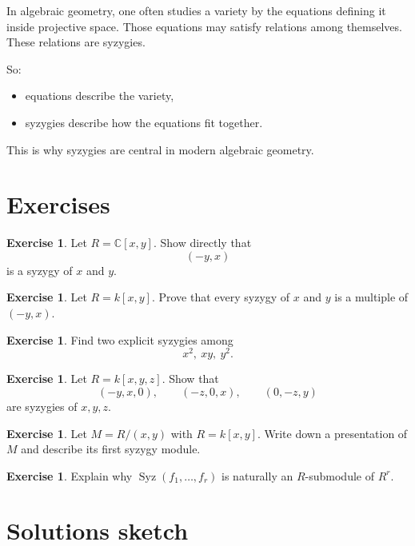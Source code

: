 \documentclass[11pt]{article}
\theoremstyle{definition}
\newtheorem{exercise}[theorem]{Exercise}
\theoremstyle{remark}
\newcommand{\C}{\mathbb{C}}
\newcommand{\Syz}{\operatorname{Syz}}
\begin{document}
	In algebraic geometry, one often studies a variety by the equations defining it inside projective space. Those equations may satisfy relations among themselves. These relations are syzygies.
	
	So:
	
	\begin{itemize}[leftmargin=2em]
		\item equations describe the variety,
		\item syzygies describe how the equations fit together.
	\end{itemize}
	
	This is why syzygies are central in modern algebraic geometry.
	
	\section{Exercises}
	
	\begin{exercise}
		Let \(R=\C[x,y]\). Show directly that
		\[
		(-y,x)
		\]
		is a syzygy of \(x\) and \(y\).
	\end{exercise}
	
	\begin{exercise}
		Let \(R=k[x,y]\). Prove that every syzygy of \(x\) and \(y\) is a multiple of \((-y,x)\).
	\end{exercise}
	
	\begin{exercise}
		Find two explicit syzygies among
		\[
		x^2,\ xy,\ y^2.
		\]
	\end{exercise}
	
	\begin{exercise}
		Let \(R=k[x,y,z]\). Show that
		\[
		(-y,x,0),\qquad (-z,0,x),\qquad (0,-z,y)
		\]
		are syzygies of \(x,y,z\).
	\end{exercise}
	
	\begin{exercise}
		Let \(M=R/(x,y)\) with \(R=k[x,y]\). Write down a presentation of \(M\) and describe its first syzygy module.
	\end{exercise}
	
	\begin{exercise}
		Explain why \(\Syz(f_1,\dots,f_r)\) is naturally an \(R\)-submodule of \(R^r\).
	\end{exercise}
	
	\section{Solutions sketch}
	
\end{document}
